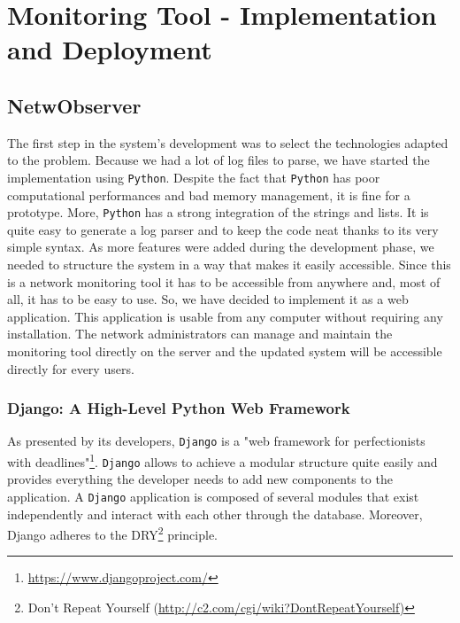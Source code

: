 \chapter{Monitoring Tool - Implementation and Deployment} %

\label{Chapter4} %


\section{NetwObserver}
The first step in the system's development was to select the technologies adapted to the problem. Because we had a lot of log files to parse, we have started the implementation using \texttt{Python}. Despite the fact that \texttt{Python} has poor computational performances and bad memory management, it is fine for a prototype. More, \texttt{Python} has a strong integration of the strings and lists. It is quite easy to generate a log parser and to keep the code neat thanks to its very simple syntax.
As more features were added during the development phase, we needed to structure the system in a way that makes it easily accessible. Since this  is a network monitoring tool it has to be accessible from anywhere and, most of all, it has to be easy to use. So, we have decided to implement it as a web application. This application is usable from any computer without requiring any installation. The network administrators can manage and maintain the monitoring tool directly on the server and the updated system will be accessible directly for every users.

\subsection{Django: A High-Level Python Web Framework}
As presented by its developers, \texttt{Django} is a "web framework for perfectionists with deadlines"\footnote{\url{https://www.djangoproject.com/}}. \texttt{Django} allows to achieve a modular structure quite easily and provides everything the developer needs to add new components to the application. A \texttt{Django} application is composed of several modules that exist independently and interact with each other through the database.
Moreover, Django adheres to the DRY\footnote{Don't Repeat Yourself (\url{http://c2.com/cgi/wiki?DontRepeatYourself)}} principle.

